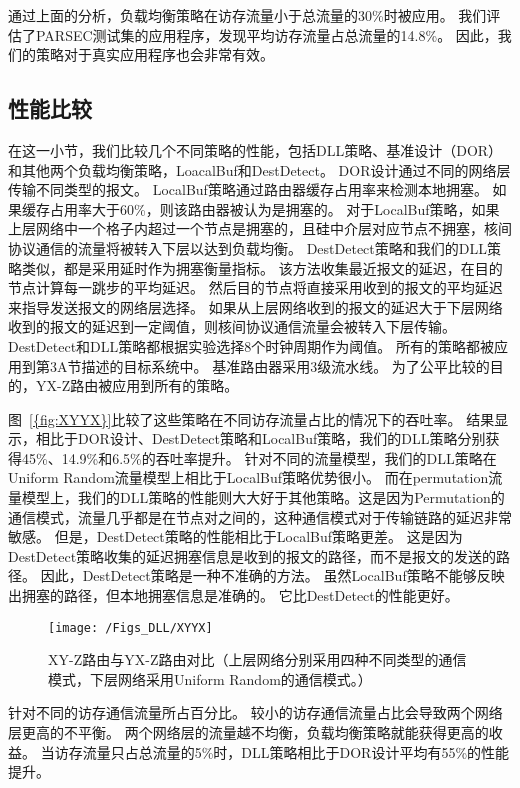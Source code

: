 通过上面的分析，负载均衡策略在访存流量小于总流量的30\%时被应用。
我们评估了PARSEC测试集的应用程序，发现平均访存流量占总流量的14.8\%。
因此，我们的策略对于真实应用程序也会非常有效。

\subsection{性能比较}

在这一小节，我们比较几个不同策略的性能，包括DLL策略、基准设计（DOR）和其他两个负载均衡策略，LoacalBuf和DestDetect。
DOR设计通过不同的网络层传输不同类型的报文。
LocalBuf策略通过路由器缓存占用率来检测本地拥塞。
如果缓存占用率大于60\%，则该路由器被认为是拥塞的。
对于LocalBuf策略，如果上层网络中一个格子内超过一个节点是拥塞的，且硅中介层对应节点不拥塞，核间协议通信的流量将被转入下层以达到负载均衡。
DestDetect策略和我们的DLL策略类似，都是采用延时作为拥塞衡量指标。
该方法收集最近报文的延迟，在目的节点计算每一跳步的平均延迟。
然后目的节点将直接采用收到的报文的平均延迟来指导发送报文的网络层选择。
如果从上层网络收到的报文的延迟大于下层网络收到的报文的延迟到一定阈值，则核间协议通信流量会被转入下层传输。
DestDetect和DLL策略都根据实验选择8个时钟周期作为阈值。
所有的策略都被应用到第3A节描述的目标系统中。
基准路由器采用3级流水线。
为了公平比较的目的，YX-Z路由被应用到所有的策略。

图~\ref{{fig:XYYX}}比较了这些策略在不同访存流量占比的情况下的吞吐率。
结果显示，相比于DOR设计、DestDetect策略和LocalBuf策略，我们的DLL策略分别获得45\%、14.9\%和6.5\%的吞吐率提升。
针对不同的流量模型，我们的DLL策略在Uniform Random流量模型上相比于LocalBuf策略优势很小。
而在permutation流量模型上，我们的DLL策略的性能则大大好于其他策略。这是因为Permutation的通信模式，流量几乎都是在节点对之间的，这种通信模式对于传输链路的延迟非常敏感。
但是，DestDetect策略的性能相比于LocalBuf策略更差。
这是因为DestDetect策略收集的延迟拥塞信息是收到的报文的路径，而不是报文的发送的路径。
因此，DestDetect策略是一种不准确的方法。
虽然LocalBuf策略不能够反映出拥塞的路径，但本地拥塞信息是准确的。
它比DestDetect的性能更好。

\begin{figure}[htbp] %
  \centering
  \texttt{[image: /Figs\_DLL/XYYX]}
  \caption{XY-Z路由与YX-Z路由对比（上层网络分别采用四种不同类型的通信模式，下层网络采用Uniform Random的通信模式。）}
  \label{fig:XYYX}
\end{figure}

针对不同的访存通信流量所占百分比。
较小的访存通信流量占比会导致两个网络层更高的不平衡。
两个网络层的流量越不均衡，负载均衡策略就能获得更高的收益。
当访存流量只占总流量的5\%时，DLL策略相比于DOR设计平均有55\%的性能提升。




